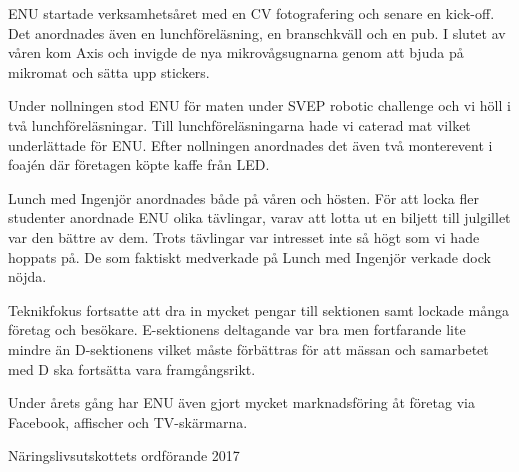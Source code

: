 \documentclass[../_main/handlingar.tex]{subfiles}
\begin{document}
ENU startade verksamhetsåret med en CV fotografering och senare en kick-off. Det anordnades även en lunchföreläsning, en branschkväll och en pub. I slutet av våren kom Axis och invigde de nya mikrovågsugnarna genom att bjuda på mikromat och sätta upp stickers.

Under nollningen stod ENU för maten under SVEP robotic challenge och vi höll i två lunchföreläsningar. Till lunchföreläsningarna hade vi caterad mat vilket underlättade för ENU. Efter nollningen anordnades det även två monterevent i foajén där företagen köpte kaffe från LED.

Lunch med Ingenjör anordnades både på våren och hösten. För att locka fler studenter anordnade ENU olika tävlingar, varav att lotta ut en biljett till julgillet var den bättre av dem. Trots tävlingar var intresset inte så högt som vi hade hoppats på. De som faktiskt medverkade på Lunch med Ingenjör verkade dock nöjda.

Teknikfokus fortsatte att dra in mycket pengar till sektionen samt lockade många företag och besökare. E-sektionens deltagande var bra men fortfarande lite mindre än D-sektionens vilket måste förbättras för att mässan och samarbetet med D ska fortsätta vara framgångsrikt.

Under årets gång har ENU även gjort mycket marknadsföring åt företag via Facebook, affischer och TV-skärmarna.
\begin{signatures}{1}
    \mvh
    \signature{Josefine Sandström}{Näringslivsutskottets ordförande 2017}
\end{signatures}
\end{document}
